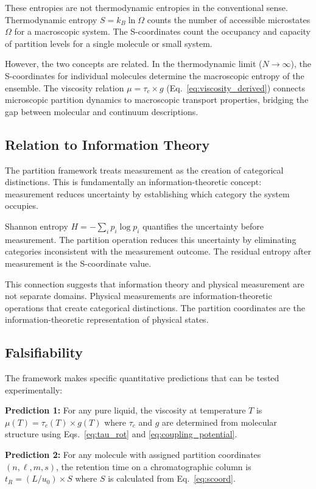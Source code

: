 \documentclass[twocolumn,superscriptaddress,prb,10pt]{revtex4-2}
\begin{document}
These entropies are not thermodynamic entropies in the conventional sense. Thermodynamic entropy $S = k_B \ln \Omega$ counts the number of accessible microstates $\Omega$ for a macroscopic system. The S-coordinates count the occupancy and capacity of partition levels for a single molecule or small system.

However, the two concepts are related. In the thermodynamic limit ($N \to \infty$), the S-coordinates for individual molecules determine the macroscopic entropy of the ensemble. The viscosity relation $\mu = \tau_c \times g$ (Eq.~\ref{eq:viscosity_derived}) connects microscopic partition dynamics to macroscopic transport properties, bridging the gap between molecular and continuum descriptions.

\subsection{Relation to Information Theory}

The partition framework treats measurement as the creation of categorical distinctions. This is fundamentally an information-theoretic concept: measurement reduces uncertainty by establishing which category the system occupies.

Shannon entropy $H = -\sum_i p_i \log p_i$ quantifies the uncertainty before measurement. The partition operation reduces this uncertainty by eliminating categories inconsistent with the measurement outcome. The residual entropy after measurement is the S-coordinate value.

This connection suggests that information theory and physical measurement are not separate domains. Physical measurements are information-theoretic operations that create categorical distinctions. The partition coordinates are the information-theoretic representation of physical states.

\subsection{Falsifiability}

The framework makes specific quantitative predictions that can be tested experimentally:

\textbf{Prediction 1:} For any pure liquid, the viscosity at temperature $T$ is $\mu(T) = \tau_c(T) \times g(T)$ where $\tau_c$ and $g$ are determined from molecular structure using Eqs.~\ref{eq:tau_rot} and \ref{eq:coupling_potential}.

\textbf{Prediction 2:} For any molecule with assigned partition coordinates $(n, \ell, m, s)$, the retention time on a chromatographic column is $t_R = (L/u_0) \times S$ where $S$ is calculated from Eq.~\ref{eq:scoord}.
\end{document}
